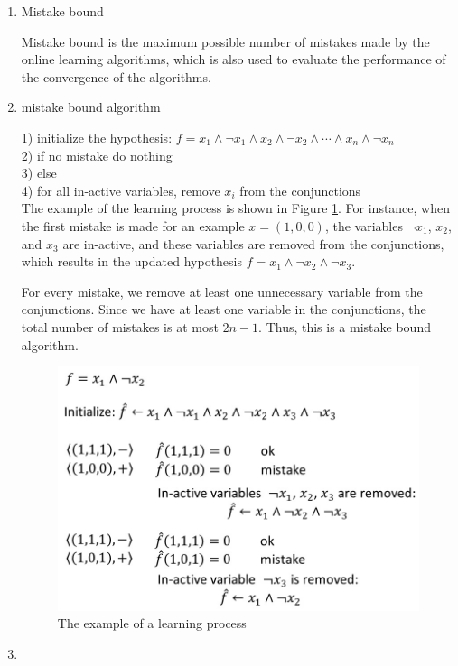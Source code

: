 \begin{enumerate}
\item Mistake bound

Mistake bound is the maximum possible number of mistakes made by the online learning algorithms, which is also used to evaluate the performance of the convergence of the algorithms. 

\item mistake bound algorithm

1) initialize the hypothesis: $f = x_1 \wedge \neg x_1 \wedge x_2 \wedge \neg x_2 \wedge \cdots \wedge x_n \wedge \neg x_n$ \\
2) if no mistake do nothing \\
3) else \\
4)    for all in-active variables, remove $x_i$ from the conjunctions \\ 

The example of the learning process is shown in Figure \ref{fig:learning_process}. For instance, when the first mistake is made for an example $x=(1, 0, 0)$, the variables $\neg x_1$, $ x_2$, and $x_3$ are in-active, and these variables are removed from the conjunctions, which results in the updated hypothesis $f = x_1 \wedge \neg x_2 \wedge \neg x_3$. 

For every mistake, we remove at least one unnecessary variable from the conjunctions. Since we have at least one variable in the conjunctions, the total number of mistakes is at most $2n-1$. Thus, this is a mistake bound algorithm.

\begin{figure}[hbtp]
\centering
\includegraphics[width=110mm]{figure1.jpg}
\caption{The example of a learning process}
\label{fig:learning_process}
\end{figure}

\item 


\end{enumerate}

